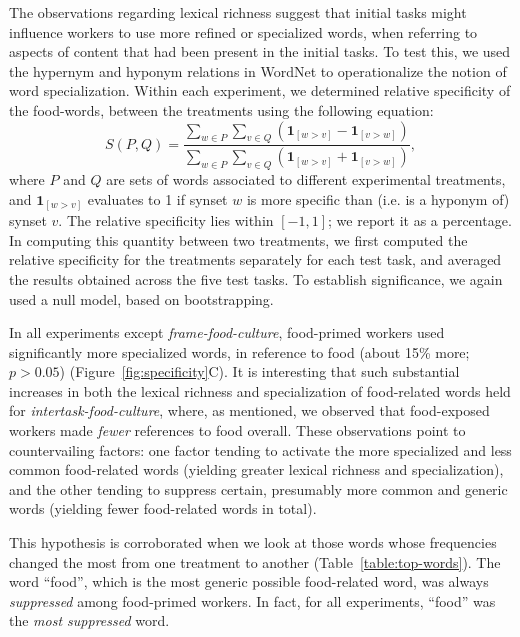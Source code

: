 \documentclass{sigchi}
\begin{document}
The observations regarding lexical richness suggest that 
initial tasks might influence workers to use more refined or specialized 
words, when referring to aspects of content that had been present in the 
initial tasks.  
To test this, we used the hypernym and hyponym relations in WordNet 
to operationalize the notion of word specialization.  
Within each experiment, we determined relative specificity
of the food-words, between the treatments using the following equation:
\begin{equation}
	S(P,Q) = \frac{
		\sum_{w\in P}\sum_{v\in Q} \left(
			\mathbf{1}_{[w>v]} - \mathbf{1}_{[v>w]} \right)
	}{
		\sum_{w\in P}\sum_{v\in Q} \left(
			\mathbf{1}_{[w>v]} + \mathbf{1}_{[v>w]} \right)
	},
\end{equation}
where $P$ and $Q$ are sets of words associated to different experimental 
treatments, and $\mathbf{1}_{[w>v]}$ evaluates
to 1 if synset $w$ is more specific than (i.e. is a hyponym of) synset $v$.
The relative specificity lies within $[-1,1]$; 
we report it as a percentage.
In computing this quantity between two treatments, we first computed the 
relative specificity for the treatments separately for each test task, and 
averaged the results obtained across the five test tasks.  To establish
significance, we again used a null model, based on bootstrapping.

In all experiments except \textit{frame-food-culture}, food-primed workers 
used significantly more specialized words, in reference to food 
(about 15\% more; $p > 0.05$) (Figure~\ref{fig:specificity}C).
It is interesting that such substantial increases in both the lexical 
richness and specialization of food-related words 
held for \textit{intertask-food-culture}, where, as mentioned, we observed 
that food-exposed workers made \textit{fewer} references to food overall. 
These observations point 
to countervailing factors: one factor tending to activate the more 
specialized and less common food-related words 
(yielding greater lexical richness and specialization), and the other tending 
to suppress certain, presumably more common and generic words 
(yielding fewer food-related words in total).

This hypothesis is corroborated when we look at those words whose 
frequencies changed the most from one treatment to another 
(Table~\ref{table:top-words}).  
The word ``food'', which is the most generic possible food-related word, was 
always \textit{suppressed} among food-primed workers.  In fact, 
for all experiments, ``food'' was the \textit{most suppressed} word.
\end{document}
